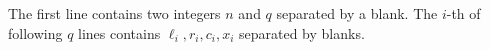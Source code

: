 The first line contains two integers $n$ and $q$ separated by a blank.
The $i$-th of following $q$ lines contains $\ell_i, r_i, c_i, x_i$
separated by blanks.
